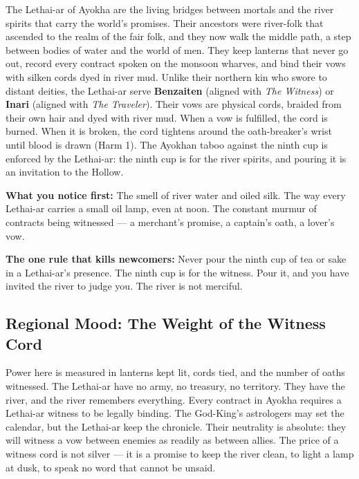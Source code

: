 \vspace{2mm}
\begin{tcolorbox}[colback=black!3,colframe=blue!60!black,title={Theme \& Atmosphere},breakable]
The Lethai-ar of Ayokha are the living bridges between mortals and the river spirits that carry the world's promises. Their ancestors were river-folk that ascended to the realm of the fair folk, and they now walk the middle path, a step between bodies of water and the world of men. They keep lanterns that never go out, record every contract spoken on the monsoon wharves, and bind their vows with silken cords dyed in river mud. Unlike their northern kin who swore to distant deities, the Lethai-ar serve \textbf{Benzaiten} (aligned with \textit{The Witness}) or \textbf{Inari} (aligned with \textit{The Traveler}). Their vows are physical cords, braided from their own hair and dyed with river mud. When a vow is fulfilled, the cord is burned. When it is broken, the cord tightens around the oath-breaker's wrist until blood is drawn (Harm 1). The Ayokhan taboo against the ninth cup is enforced by the Lethai-ar: the ninth cup is for the river spirits, and pouring it is an invitation to the Hollow.

\vspace{2mm}
\textbf{What you notice first:} The smell of river water and oiled silk. The way every Lethai-ar carries a small oil lamp, even at noon. The constant murmur of contracts being witnessed --- a merchant's promise, a captain's oath, a lover's vow.

\textbf{The one rule that kills newcomers:} Never pour the ninth cup of tea or sake in a Lethai-ar's presence. The ninth cup is for the witness. Pour it, and you have invited the river to judge you. The river is not merciful.
\end{tcolorbox}

\subsection*{Regional Mood: The Weight of the Witness Cord}

Power here is measured in lanterns kept lit, cords tied, and the number of oaths witnessed. The Lethai-ar have no army, no treasury, no territory. They have the river, and the river remembers everything. Every contract in Ayokha requires a Lethai-ar witness to be legally binding. The God-King's astrologers may set the calendar, but the Lethai-ar keep the chronicle. Their neutrality is absolute: they will witness a vow between enemies as readily as between allies. The price of a witness cord is not silver --- it is a promise to keep the river clean, to light a lamp at dusk, to speak no word that cannot be unsaid.

